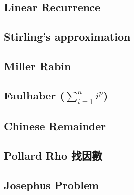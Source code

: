 \documentclass[a4paper,10pt,twocolumn,oneside]{article}
\begin{document}
\subsection{Linear Recurrence}


\subsection{Stirling's approximation}


\subsection{Miller Rabin}


% 

\subsection{Faulhaber ($\sum\limits_{i=1}^{n}i^p$)}


\subsection{Chinese Remainder}


\subsection{Pollard Rho 找因數}


\subsection{Josephus Problem}


%

%
\end{document}

